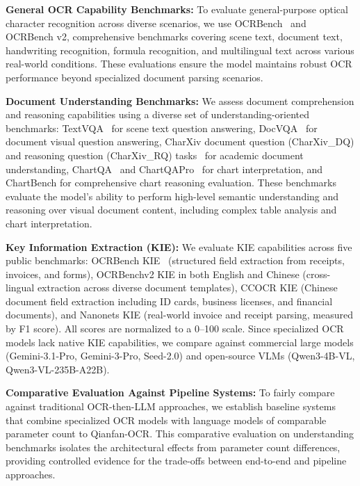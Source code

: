 \documentclass[dvipsnames]{article}
\begin{document}
\textbf{General OCR Capability Benchmarks:}
To evaluate general-purpose optical character recognition across diverse scenarios, we use OCRBench~\citep{chen2024ocrbench} and OCRBench v2, comprehensive benchmarks covering scene text, document text, handwriting recognition, formula recognition, and multilingual text across various real-world conditions.
These evaluations ensure the model maintains robust OCR performance beyond specialized document parsing scenarios.

\textbf{Document Understanding Benchmarks:}
We assess document comprehension and reasoning capabilities using a diverse set of understanding-oriented benchmarks: TextVQA~\citep{singh2019towards} for scene text question answering, DocVQA~\citep{mathew2021docvqa} for document visual question answering, CharXiv document question (CharXiv\_DQ) and reasoning question (CharXiv\_RQ) tasks~\citep{wang2024charxiv} for academic document understanding, ChartQA~\citep{masry2022chartqa} and ChartQAPro~\citep{masry2025chartqapro} for chart interpretation, and ChartBench for comprehensive chart reasoning evaluation.
These benchmarks evaluate the model's ability to perform high-level semantic understanding and reasoning over visual document content, including complex table analysis and chart interpretation.

\textbf{Key Information Extraction (KIE):}
We evaluate KIE capabilities across five public benchmarks: OCRBench KIE~\citep{chen2024ocrbench} (structured field extraction from receipts, invoices, and forms), OCRBenchv2 KIE in both English and Chinese (cross-lingual extraction across diverse document templates), CCOCR KIE (Chinese document field extraction including ID cards, business licenses, and financial documents), and Nanonets KIE (real-world invoice and receipt parsing, measured by F1 score). All scores are normalized to a 0--100 scale. Since specialized OCR models lack native KIE capabilities, we compare against commercial large models (Gemini-3.1-Pro, Gemini-3-Pro, Seed-2.0) and open-source VLMs (Qwen3-4B-VL, Qwen3-VL-235B-A22B).

\textbf{Comparative Evaluation Against Pipeline Systems:}
To fairly compare against traditional OCR-then-LLM approaches, we establish baseline systems that combine specialized OCR models with language models of comparable parameter count to Qianfan-OCR.
This comparative evaluation on understanding benchmarks isolates the architectural effects from parameter count differences, providing controlled evidence for the trade-offs between end-to-end and pipeline approaches.
\end{document}
